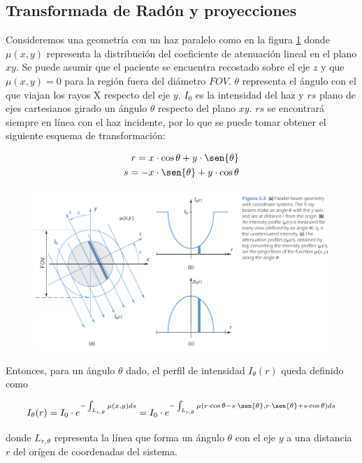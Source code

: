 \subsection{Transformada de Rad\'on y proyecciones}

Consideremos una geometría con un haz paralelo como en la figura \ref{fig:10-1} donde $\mu(x,y)$ representa la distribución del coeficiente de atenuación lineal en el plano $xy$. Se puede asumir que el paciente se encuentra recostado sobre el eje $z$ y que $\mu(x,y) = 0$ para la región fuera del diámetro $FOV$. $\theta$ representa el ángulo con el que viajan los rayos X respecto del eje $y$, $I_{0}$ es la intensidad del haz y $rs$ plano de ejes cartesianos girado un ángulo $\theta$ respecto del plano $xy$. $rs$ se encontrará siempre en línea con el haz incidente, por lo que se puede tomar obtener el siguiente esquema de transformación:

\begin{eqnarray}
 r = x\cdot \cos{\theta} + y \cdot \sen{\theta} \\
 s = - x \cdot \sen{\theta} + y \cdot \cos{\theta}
\end{eqnarray}

\begin{figure}
 \centering
 \includegraphics[width=.75\textwidth]{Figuras/cap10-1.png}
 \caption{}
 \label{fig:10-1}
\end{figure}

Entonces, para un ángulo $\theta$ dado, el perfil de intensidad $I_{\theta}(r)$ queda definido como

\begin{equation}
 I_{\theta}(r) = I_{0} \cdot e^{-\int_{L_{r,\theta}}\mu(x,y)ds} = I_{0} \cdot e^{-\int_{L_{r,\theta}}\mu(r\cdot \cos{\theta} - s\cdot \sen{\theta},r\cdot\sen{\theta} + s\cdot\cos{\theta})ds}
 \label{eq.10-4}
\end{equation}

\noindent
donde $L_{r,\theta}$ representa la línea que forma un ángulo $\theta$ con el eje $y$ a una distancia $r$ del orígen de coordenadas del sistema.

